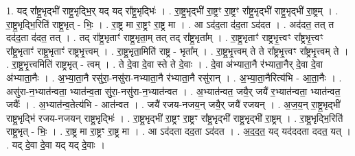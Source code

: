 \documentclass[17pt]{extarticle}
\begin{document}
1. यद् रा᳚ष्ट्र॒भृद्भी॑ राष्ट्र॒भृद्भि॒र् यद् यद् रा᳚ष्ट्र॒भृद्भिः॑ । . रा॒ष्ट्र॒भृद्भी॑ रा॒ष्ट्रꣳ रा॒ष्ट्रꣳ रा᳚ष्ट्र॒भृद्भी॑ राष्ट्र॒भृद्भी॑ रा॒ष्ट्रम् । . रा॒ष्ट्र॒भृद्भि॒रिति॑ राष्ट्र॒भृत् - भिः॒ । . रा॒ष्ट्र मा रा॒ष्ट्रꣳ रा॒ष्ट्र मा । . आ ऽद॑द॒ता द॑द॒ता ऽद॑दत । . अद॑दत॒ तत् त दद॑द॒ता द॑दत॒ तत् । . तद् रा᳚ष्ट्र॒भृताꣳ॑ राष्ट्र॒भृता॒म् तत् तद् रा᳚ष्ट्र॒भृता᳚म् । . रा॒ष्ट्र॒भृताꣳ॑ राष्ट्रभृ॒त्त्वꣳ रा᳚ष्ट्रभृ॒त्त्वꣳ रा᳚ष्ट्र॒भृताꣳ॑ राष्ट्र॒भृताꣳ॑ राष्ट्रभृ॒त्त्वम् । . रा॒ष्ट्र॒भृता॒मिति॑ राष्ट्र - भृता᳚म् । . रा॒ष्ट्र॒भृ॒त्त्वम् ते ते रा᳚ष्ट्रभृ॒त्त्वꣳ रा᳚ष्ट्रभृ॒त्त्वम् ते । . रा॒ष्ट्र॒भृ॒त्त्वमिति॑ राष्ट्रभृत् - त्वम् । . ते दे॒वा दे॒वा स्ते ते दे॒वाः । . दे॒वा अ॑भ्याता॒नै र॑भ्याता॒नैर् दे॒वा दे॒वा अ॑भ्याता॒नैः । . अ॒भ्या॒ता॒नै रसु॑रा॒-नसु॑रा-नभ्याता॒नै र॑भ्याता॒नै रसु॑रान् । . अ॒भ्या॒ता॒नैरित्य॑भि - आ॒ता॒नैः । . असु॑रा-न॒भ्यात॑न्वता॒ भ्यात॑न्व॒ता सु॑रा॒-नसु॑रा-न॒भ्यात॑न्वत । . अ॒भ्यात॑न्वत॒ जयै॒र् जयै॑ र॒भ्यात॑न्वता॒ भ्यात॑न्वत॒ जयैः᳚ । . अ॒भ्यात॑न्व॒तेत्य॑भि - आत॑न्वत । . जयै॑ रजय-नजय॒न् जयै॒र् जयै॑ रजयन् । . अ॒ज॒य॒न् रा॒ष्ट्र॒भृद्भी॑ राष्ट्र॒भृद्भि॑ रजय-नजयन् राष्ट्र॒भृद्भिः॑ । . रा॒ष्ट्र॒भृद्भी॑ रा॒ष्ट्रꣳ रा॒ष्ट्रꣳ रा᳚ष्ट्र॒भृद्भी॑ राष्ट्र॒भृद्भी॑ रा॒ष्ट्रम् । . रा॒ष्ट्र॒भृद्भि॒रिति॑ राष्ट्र॒भृत् - भिः॒ । . रा॒ष्ट्र मा रा॒ष्ट्रꣳ रा॒ष्ट्र मा । . आ ऽद॑दता दद॒ता ऽद॑दत । . अ॒द॒द॒त॒ यद् यद॑ददता ददत॒ यत् । . यद् दे॒वा दे॒वा यद् यद् दे॒वाः । \newline
\end{document}
